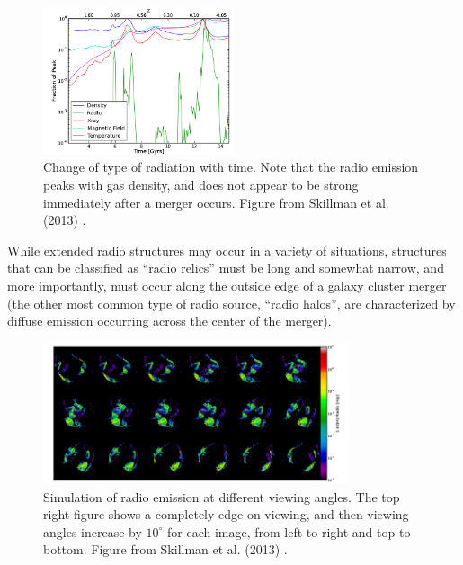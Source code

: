 \documentclass[12 pt]{article}
\renewcommand{\baselinestretch}{2}
\begin{document}
\renewcommand{\baselinestretch}{1}
\begin{figure}[h!]
\caption{Change of type of radiation with time. Note that the radio emission peaks with gas density, and does not appear to be strong immediately after a merger occurs. Figure from Skillman et al. (2013) \cite{Skillman13}.}
\label{skillman5}
\centering
\includegraphics[width=0.5\textwidth]{skillman5}
\end{figure}
\renewcommand{\baselinestretch}{2}

While extended radio structures may occur in a variety of situations, structures that can be classified as “radio relics” must be long and somewhat narrow, and more importantly, must occur along the outside edge of a galaxy cluster merger (the other most common type of radio source, “radio halos”,  are characterized by diffuse emission occurring across the center of the merger). 

\renewcommand{\baselinestretch}{1}
\begin{figure}[h]
\caption{Simulation of radio emission at different viewing angles. The top right figure shows a completely edge-on viewing, and then viewing angles increase by $10^{\circ}$ for each image, from left to right and top to bottom. Figure from Skillman et al. (2013) \cite{Skillman13}.}
\label{skillman6}
\centering
\includegraphics[width=0.8\textwidth]{skillman6}
\end{figure}
\renewcommand{\baselinestretch}{2}
\end{document}
